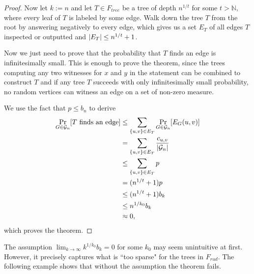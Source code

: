 \begin{proof}
Now let $k:=n$ and let $T\in F_{tree}$ be a tree of depth $n^{1/t}$ for some $t>\mathbb{N}$, where every leaf of $T$ is labeled by some edge. Walk down the tree $T$ from the root by answering negatively to every edge, which gives us a set $E_T$ of all edges $T$ inspected or outputted and $\left|{E_T}\right|\leq n^{1/t}+1$.

Now we just need to prove that the probability that $T$ finds an edge is infinitesimally small. This is enough to prove the theorem, since the trees computing any two witnesses for $x$ and $y$ in the statement can be combined to construct $T$ and if any tree $T$ succeeds with only infinitesimally small probability, no random vertices can witness an edge on a set of non-zero measure.

We use the fact that $p\leq b_n$ to derive 
\begin{align}
\Pr_{G\in\mathcal{G}_n}[T\text{ finds an edge}]&\leq \sum_{\{u,v\}\in E_T} \Pr_{G\in \mathcal{G}_n}[E_G(u,v)]\\
&=\sum_{\{u,v\}\in E_T} \frac{c_{u,v}}{\left|{\mathcal{G}_n}\right|}\\
&\leq\sum_{\{u,v\}\in E_T} p\\
&=(n^{1/t}+1)p\\
&\leq(n^{1/t}+1)b_k\\
&\leq n^{1/k_0}b_k\\
&\approx 0,
\end{align}
which proves the theorem.
\end{proof}

The assumption $\lim_{k\to \infty} k^{1/k_0}b_k=0$ for some $k_0$ may seem unintuitive at first. However, it precisely captures what is ``too sparse" for the trees in $F_{rud}$. The following example shows that without the assumption the theorem fails.

